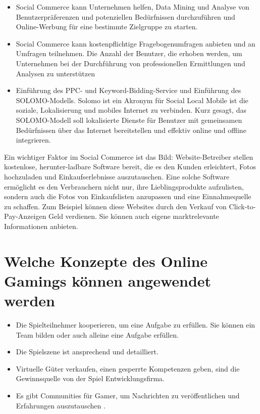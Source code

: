 \begin{itemize}
\begin{itemize}
\item Social Commerce kann Unternehmen helfen, Data Mining und Analyse von Benutzerpräferenzen und potenziellen Bedürfnissen durchzuführen und Online-Werbung für eine bestimmte Zielgruppe zu starten.
\item Social Commerce kann kostenpflichtige Fragebogenumfragen anbieten und an Umfragen teilnehmen. Die Anzahl der Benutzer, die erhoben werden, um Unternehmen bei der Durchführung von professionellen Ermittlungen und Analysen zu unterstützen
\item Einführung des PPC- und Keyword-Bidding-Service und Einführung des SOLOMO-Modells. Solomo ist ein Akronym für Social Local Mobile ist die soziale, Lokalisierung und mobiles Internet zu verbinden. Kurz gesagt, das SOLOMO-Modell soll lokalisierte Dienste für Benutzer mit gemeinsamen Bedürfnissen über das Internet bereitstellen und effektiv online und offline integrieren.
\end{itemize}

\end{itemize}

Ein wichtiger Faktor im Social Commerce ist das Bild: Website-Betreiber stellen kostenlose, herunter-ladbare Software bereit, die es den Kunden erleichtert, Fotos hochzuladen und Einkaufserlebnisse auszutauschen. Eine solche Software ermöglicht es den Verbrauchern nicht nur, ihre Lieblingsprodukte aufzulisten, sondern auch die Fotos von Einkaufslisten anzupassen und eine Einnahmequelle zu schaffen. Zum Beispiel können diese Websites durch den Verkauf von Click-to-Pay-Anzeigen Geld verdienen. Sie können auch eigene marktrelevante Informationen anbieten.


\section{Welche Konzepte des Online Gamings können angewendet werden}

\begin{itemize}
\item Die Spielteilnehmer kooperieren, um eine Aufgabe zu erfüllen. Sie können ein Team bilden oder auch alleine eine Aufgabe erfüllen.
\item Die Spielszene ist ansprechend und detailliert.
\item Virtuelle Güter verkaufen,  einen gesperrte Kompetenzen geben, sind die Gewinnsquelle von der Spiel Entwicklungsfirma.
\item Es gibt Communities für Gamer, um Nachrichten zu veröffentlichen und Erfahrungen auszutauschen \parencite[S. 126]{warmelink}.
\end{itemize}


